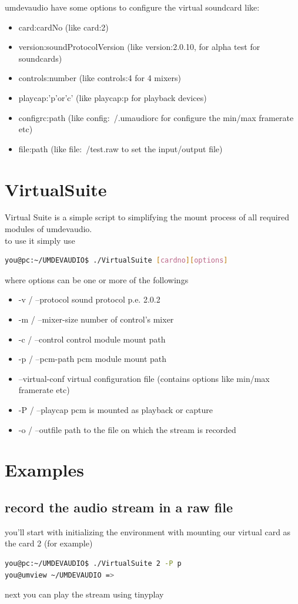 \documentclass[a4paper,12pt]{article}
\begin{document}
	umdevaudio have some options to configure the virtual soundcard like:
	\begin{itemize}
	\item card:cardNo										(like card:2)
	\item version:soundProtocolVersion	(like version:2.0.10, for alpha test for soundcards)
	\item controls:number								(like controls:4 for 4 mixers)
	\item playcap:'p'or'c'							(like playcap:p for playback devices)
	\item configrc:path									(like config:~/.umaudiorc for configure the min/max framerate etc)
	\item file:path											(like file:~/test.raw to set the input/output file)
	\end{itemize}

	\section{VirtualSuite}
	Virtual Suite is a simple script to simplifying the mount process of all required modules of umdevaudio.\\
	to use it simply use
	\begin{lstlisting}[frame=double, language=Bash]
you@pc:~/UMDEVAUDIO$ ./VirtualSuite [cardno][options]
	\end{lstlisting}
	where options can be one or more of the followings
	\begin{itemize}
	\item -v / --protocol			sound protocol p.e. 2.0.2
	\item -m / --mixer-size 	number of control's mixer
	\item -c / --control			control module mount path
	\item -p / --pcm-path			pcm module mount path
	\item --virtual-conf			virtual configuration file (contains options like min/max framerate etc)
	\item -P / --playcap			pcm is mounted as playback or capture
	\item -o / --outfile			path to the file on which the stream is recorded
	\end{itemize}


	\section{Examples}
	\subsection{record the audio stream in a raw file}
 you'll start with initializing the environment with mounting our virtual card as the card 2 (for example)
	\begin{lstlisting}[frame=double, language=Bash]
you@pc:~/UMDEVAUDIO$ ./VirtualSuite 2 -P p
you@umview ~/UMDEVAUDIO => 
	\end{lstlisting}
	next you can play the stream using tinyplay
\end{document}

